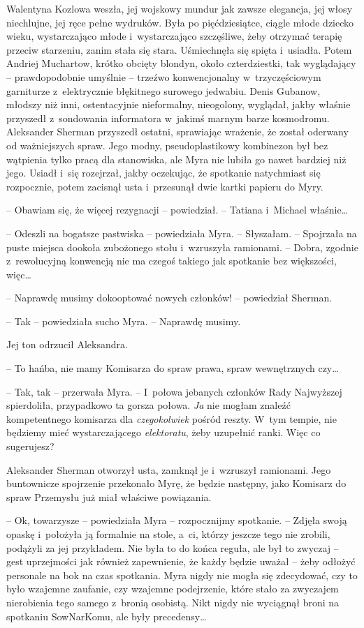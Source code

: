 \documentclass[oneside,polish,11pt,sfheadings]{mwbk}
\begin{document}
Walentyna Kozlowa weszła, jej wojskowy mundur jak zawsze elegancja, jej
włosy niechlujne, jej ręce pełne wydruków. Była po pięćdziesiątce,
ciągle młode dziecko wieku, wystarczająco młode i~wystarczająco
szczęśliwe, żeby otrzymać terapię przeciw starzeniu, zanim stała się
stara. Uśmiechnęła się spięta i~usiadła. Potem Andriej Muchartow, krótko
obcięty blondyn, około czterdziestki, tak wyglądający -- prawdopodobnie
umyślnie -- trzeźwo konwencjonalny w~trzyczęściowym garniturze z~elektrycznie błękitnego surowego jedwabiu. Denis Gubanow, młodszy niż
inni, ostentacyjnie nieformalny, nieogolony, wyglądał, jakby właśnie
przyszedł z~sondowania informatora w~jakimś marnym barze kosmodromu.
Aleksander Sherman przyszedł ostatni, sprawiając wrażenie, że został
oderwany od ważniejszych spraw. Jego modny, pseudoplastikowy kombinezon
był bez wątpienia tylko pracą dla stanowiska, ale Myra nie lubiła go
nawet bardziej niż jego. Usiadł i~się rozejrzał, jakby oczekując, że
spotkanie natychmiast się rozpocznie, potem zacisnął usta i~przesunął
dwie kartki papieru do Myry.

-- Obawiam się, że więcej rezygnacji -- powiedział. -- Tatiana i~Michael
właśnie\ldots

-- Odeszli na bogatsze pastwiska -- powiedziała Myra. -- Słyszałam. -- Spojrzała na puste miejsca dookoła zubożonego stołu i~wzruszyła
ramionami. -- Dobra, zgodnie z~rewolucyjną konwencją nie ma czegoś
takiego jak spotkanie bez większości, więc\ldots

-- Naprawdę musimy dokooptować nowych członków! -- powiedział Sherman.

-- Tak -- powiedziała sucho Myra. -- Naprawdę musimy.

Jej ton odrzucił Aleksandra. 

-- To hańba, nie mamy Komisarza do spraw
prawa, spraw wewnętrznych czy\ldots

-- Tak, tak -- przerwała Myra. -- I~połowa jebanych członków Rady
Najwyższej spierdoliła, przypadkowo ta gorsza połowa. \textit{Ja} nie
mogłam znaleźć kompetentnego komisarza dla \textit{czegokolwiek} pośród
reszty. W~tym tempie, nie będziemy mieć wystarczającego
\textit{elektoratu}, żeby uzupełnić ranki. Więc co sugerujesz?

Aleksander Sherman otworzył usta, zamknął je i~wzruszył ramionami. Jego
buntownicze spojrzenie przekonało Myrę, że będzie następny, jako
Komisarz do spraw Przemysłu już miał właściwe powiązania.

-- Ok, towarzysze -- powiedziała Myra -- rozpocznijmy spotkanie. -- Zdjęła
swoją opaskę i~położyła ją formalnie na stole, a~ci, którzy jeszcze tego
nie zrobili, podążyli za jej przykładem. Nie była to do końca reguła,
ale był to zwyczaj -- gest uprzejmości jak również zapewnienie, że każdy
będzie uważał -- żeby odłożyć personale na bok na czas spotkania. Myra
nigdy nie mogła się zdecydować, czy to było wzajemne zaufanie, czy
wzajemne podejrzenie, które stało za zwyczajem nierobienia tego samego z~bronią osobistą. Nikt nigdy nie wyciągnął broni na spotkaniu SowNarKomu,
ale były precedensy\ldots
\end{document}
